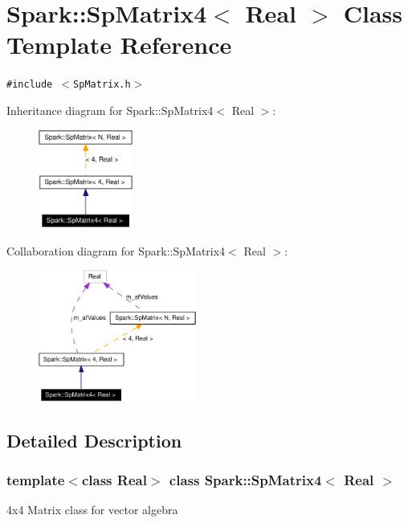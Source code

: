 \section{Spark::Sp\-Matrix4$<$ Real $>$ Class Template Reference}
\label{classSpark_1_1SpMatrix4}
{\tt \#include $<$Sp\-Matrix.h$>$}

Inheritance diagram for Spark::Sp\-Matrix4$<$ Real $>$:\begin{figure}[H]
\begin{center}
\leavevmode
\includegraphics[width=88pt]{classSpark_1_1SpMatrix4__inherit__graph}
\end{center}
\end{figure}
Collaboration diagram for Spark::Sp\-Matrix4$<$ Real $>$:\begin{figure}[H]
\begin{center}
\leavevmode
\includegraphics[width=147pt]{classSpark_1_1SpMatrix4__coll__graph}
\end{center}
\end{figure}


\subsection{Detailed Description}
\subsubsection*{template$<$class Real$>$ class Spark::Sp\-Matrix4$<$ Real $>$}

4x4 Matrix class for vector algebra 


